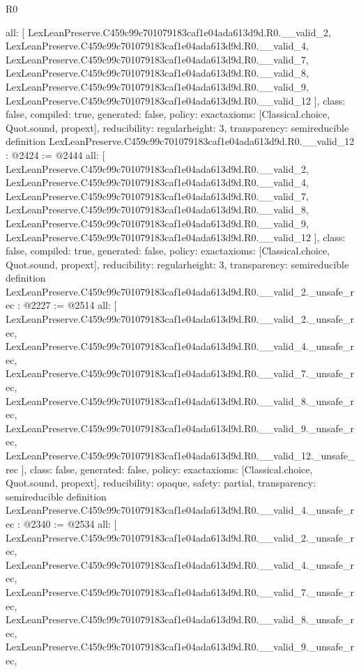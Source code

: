 \begin{lexlean}{R0}
\begin{coremodule}
{  all: [
    LexLeanPreserve.C459c99c701079183caf1e04ada613d9d.R0.__valid_2,
    LexLeanPreserve.C459c99c701079183caf1e04ada613d9d.R0.__valid_4,
    LexLeanPreserve.C459c99c701079183caf1e04ada613d9d.R0.__valid_7,
    LexLeanPreserve.C459c99c701079183caf1e04ada613d9d.R0.__valid_8,
    LexLeanPreserve.C459c99c701079183caf1e04ada613d9d.R0.__valid_9,
    LexLeanPreserve.C459c99c701079183caf1e04ada613d9d.R0.__valid_12
  ],
  class: false,
  compiled: true,
  generated: false,
  policy: exact{axioms: [Classical.choice, Quot.sound, propext]},
  reducibility: regular{height: 3},
  transparency: semireducible
}
definition LexLeanPreserve.C459c99c701079183caf1e04ada613d9d.R0.__valid_12 : @2424 := @2444 {
  all: [
    LexLeanPreserve.C459c99c701079183caf1e04ada613d9d.R0.__valid_2,
    LexLeanPreserve.C459c99c701079183caf1e04ada613d9d.R0.__valid_4,
    LexLeanPreserve.C459c99c701079183caf1e04ada613d9d.R0.__valid_7,
    LexLeanPreserve.C459c99c701079183caf1e04ada613d9d.R0.__valid_8,
    LexLeanPreserve.C459c99c701079183caf1e04ada613d9d.R0.__valid_9,
    LexLeanPreserve.C459c99c701079183caf1e04ada613d9d.R0.__valid_12
  ],
  class: false,
  compiled: true,
  generated: false,
  policy: exact{axioms: [Classical.choice, Quot.sound, propext]},
  reducibility: regular{height: 3},
  transparency: semireducible
}
definition LexLeanPreserve.C459c99c701079183caf1e04ada613d9d.R0.__valid_2._unsafe_rec : @2227 := @2514 {
  all: [
    LexLeanPreserve.C459c99c701079183caf1e04ada613d9d.R0.__valid_2._unsafe_rec,
    LexLeanPreserve.C459c99c701079183caf1e04ada613d9d.R0.__valid_4._unsafe_rec,
    LexLeanPreserve.C459c99c701079183caf1e04ada613d9d.R0.__valid_7._unsafe_rec,
    LexLeanPreserve.C459c99c701079183caf1e04ada613d9d.R0.__valid_8._unsafe_rec,
    LexLeanPreserve.C459c99c701079183caf1e04ada613d9d.R0.__valid_9._unsafe_rec,
    LexLeanPreserve.C459c99c701079183caf1e04ada613d9d.R0.__valid_12._unsafe_rec
  ],
  class: false,
  generated: false,
  policy: exact{axioms: [Classical.choice, Quot.sound, propext]},
  reducibility: opaque{},
  safety: partial,
  transparency: semireducible
}
definition LexLeanPreserve.C459c99c701079183caf1e04ada613d9d.R0.__valid_4._unsafe_rec : @2340 := @2534 {
  all: [
    LexLeanPreserve.C459c99c701079183caf1e04ada613d9d.R0.__valid_2._unsafe_rec,
    LexLeanPreserve.C459c99c701079183caf1e04ada613d9d.R0.__valid_4._unsafe_rec,
    LexLeanPreserve.C459c99c701079183caf1e04ada613d9d.R0.__valid_7._unsafe_rec,
    LexLeanPreserve.C459c99c701079183caf1e04ada613d9d.R0.__valid_8._unsafe_rec,
    LexLeanPreserve.C459c99c701079183caf1e04ada613d9d.R0.__valid_9._unsafe_rec,
}
\end{coremodule}
\end{lexlean}
